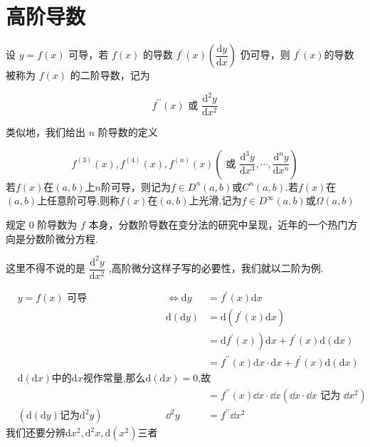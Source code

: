 \section{高阶导数}
\begin{definition}
	
	设 $y=f(x)$ 可导，若 $f(x)$ 的导数 $f^{\prime}(x)\left(\dfrac{\mathrm{d} y}{\mathrm{d} x}\right)$ 仍可导，则 $f^{\prime}(x)$的导数 被称为 $f(x)$ 的二阶导数，记为
	
	$$
	f^{\prime \prime}(x) \text { 或 } \frac{\mathrm{d}^2 y}{\mathrm{d} x^2}
	$$
	
	
	类似地，我们给出 $n$ 阶导数的定义
	
	$$
	f^{(3)}(x), f^{(4)}(x), f^{(n)}(x)\left(\text { 或 } \frac{\mathrm{d}^3 y}{\mathrm{d} x^3}, \cdots, \frac{\mathrm{d}^n y}{\mathrm{d} x^n}\right)
	$$
	若$f(x)$在$(a,b)$上$n$阶可导，则记为$f\in D^n(a,b)\text{或}C^n(a,b)$.若$f(x)$在$(a,b)$上任意阶可导,则称$f(x)$在$(a,b)$上光滑,记为$f\in D^\infty(a,b)\text{或}\Omega(a,b)$
	
	规定 $0$ 阶导数为 $f$ 本身，分数阶导数在变分法的研究中呈现，近年的一个热门方向是分数阶微分方程.
	
\end{definition}
这里不得不说的是 $\dfrac{\mathrm{d}^2 y}{\mathrm{d} x^2}$ ,高阶微分这样子写的必要性，我们就以二阶为例.

$$
\begin{aligned}
	&y=f(x) \text { 可导 } &\Leftrightarrow \mathrm{d} y & =f^{\prime}(x) \mathrm{d} x \\
	&&\mathrm{d}(\mathrm{d} y) & =\mathrm{d}\left(f^{\prime}(x) \mathrm{d} x\right) \\
	&&& \left.=\mathrm{d} f^{\prime}(x)\right) \mathrm{d} x+f^{\prime}(x) \mathrm{d}(\mathrm{d} x) \\
	&&& =f^{\prime \prime}(x) \mathrm{d} x \cdot \mathrm{d} x+f^{\prime}(x) \mathrm{d}(\mathrm{d}x)\\
	&\mathrm{d}(\mathrm{d}x)\text{中的} \mathrm{d}x \text{视作常量,那么} \mathrm{d}(\mathrm{d} x)=0 \text{,故}&&\\
	&&&=f^{\prime \prime}(x) \dd x \cdot \dd x\left(\dd x \cdot \dd x \text { 记为 } \dd x^2\right)\\
	&(\mathrm{d}(\mathrm{d}y)\text{记为}\mathrm{d}^2y)&\dd^2y&=f^{\prime\prime}\dd x^2
\end{aligned}
$$
我们还要分辨$\mathrm{d}x^2,\mathrm{d}^2x,\mathrm{d}(x^2)$三者

